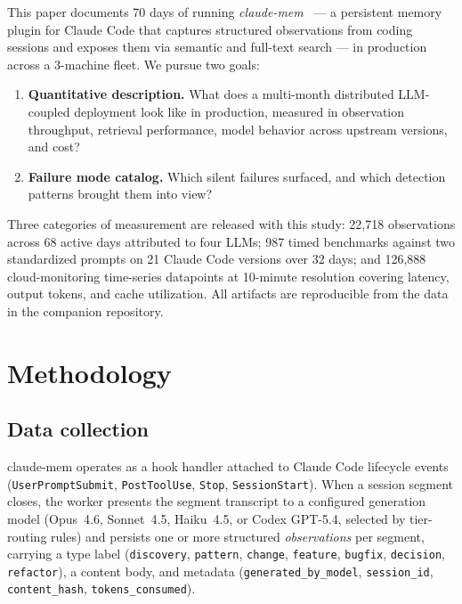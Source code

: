 \documentclass[11pt,a4paper]{article}
\begin{document}
This paper documents 70 days of running \emph{claude-mem}~\cite{claudemem} ---
a persistent memory plugin for Claude Code that captures structured
observations from coding sessions and exposes them via semantic and full-text
search --- in production across a 3-machine fleet. We pursue two goals:

\begin{enumerate}[leftmargin=*]
  \item \textbf{Quantitative description.} What does a multi-month distributed
        LLM-coupled deployment look like in production, measured in observation
        throughput, retrieval performance, model behavior across upstream
        versions, and cost?
  \item \textbf{Failure mode catalog.} Which silent failures surfaced, and
        which detection patterns brought them into view?
\end{enumerate}

Three categories of measurement are released with this study: 22{,}718
observations across 68 active days attributed to four LLMs;
987 timed benchmarks against two standardized prompts on 21 Claude Code versions
over 32 days; and 126{,}888 cloud-monitoring time-series datapoints at
10-minute resolution covering latency, output tokens, and cache utilization.
All artifacts are reproducible from the data in the companion repository.

\section{Methodology}

\subsection{Data collection}

claude-mem operates as a hook handler attached to Claude Code lifecycle events
(\texttt{UserPromptSubmit}, \texttt{PostToolUse}, \texttt{Stop},
\texttt{SessionStart}). When a session segment closes, the worker presents the
segment transcript to a configured generation model (Opus~4.6, Sonnet~4.5,
Haiku~4.5, or Codex GPT-5.4, selected by tier-routing rules) and persists one
or more structured \emph{observations} per segment, carrying a type label
(\texttt{discovery}, \texttt{pattern}, \texttt{change}, \texttt{feature},
\texttt{bugfix}, \texttt{decision}, \texttt{refactor}), a content body, and
metadata (\texttt{generated\_by\_model}, \texttt{session\_id},
\texttt{content\_hash}, \texttt{tokens\_consumed}).
\end{document}
